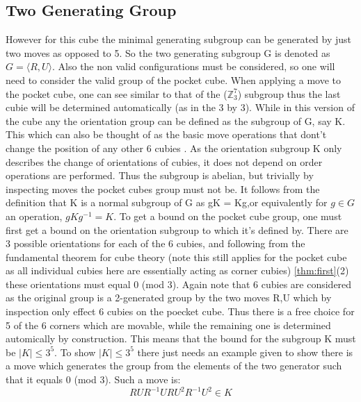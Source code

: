 \documentclass{article}
\newcounter{theo}[section]\setcounter{theo}{0}
\newcounter{lem}[section]\setcounter{lem}{0}
\begin{document}
\subsection{Two Generating Group}

However for this cube the minimal generating subgroup can be generated by just two moves as opposed to 5. So the two generating subgroup G is denoted as $G = \langle R, U\rangle$. Also the non valid configurations must be considered, so one will need to consider the valid group of the pocket cube. When applying a move to the pocket cube, one can see similar to that of the ($\mathbb{Z}_{3}^{7}$) subgroup thus the last cubie will be determined automatically (as in the 3 by 3). While in this version of the cube any the orientation group can be defined as the subgroup of G, say K. This which can also be thought of as the basic move operations that dont't change the position of any other 6 cubies \cite{bump2006unravelling}. As the orientation subgroup K only describes the change of orientations of cubies, it does not depend on order operations are performed. Thus the subgroup is abelian, but trivially by inspecting moves the pocket cubes group must not be. It follows from the definition that K is a normal subgroup of G as gK = Kg,or equivalently for $g \in G$ an operation, $gKg^{-1} = K$. To get a bound on the pocket cube group, one must first get a bound on the orientation subgroup to which it's defined by. There are 3 possible orientations for each of the 6 cubies, and following from  the fundamental theorem for cube theory (note this still applies for the pocket cube as all individual cubies here are essentially acting as corner cubies) \ref{thm:first}(2) these orientations must equal 0 (mod 3). Again note that 6 cubies are considered as the original group is a 2-generated group by the two moves R,U which by inspection only effect 6 cubies on the poecket cube. Thus there is a free choice for 5 of the 6 corners which are movable, while the remaining one is determined automically by construction. This means that the bound for the subgroup K must be $|K| \leq 3^5$. To show $|K| \leq 3^5$ there just needs an example given to show there is a move which generates the group from the elements of the two generator such that it equals 0 (mod 3). Such a move is:
\begin{equation}
RUR^{-1}URU^{2}R^{-1}U^{2} \in K
\end{equation}

\newcommand{\changecorner}{[Orient 3 Corner],R,U,Rp,U,R,U2,Rp,U2}%
\newcommand{\changecornerarrow}{$\quad\overrightarrow{\strut\textsc{invalidseq}}\quad$}
\end{document}
